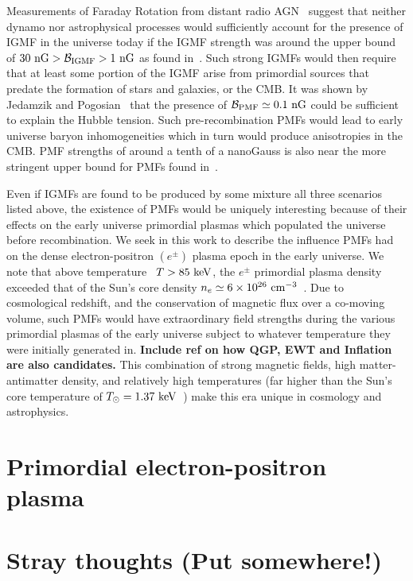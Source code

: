 \documentclass[a4paper]{article}
\begin{document}
Measurements of Faraday Rotation from distant radio AGN~\cite{pomakov2022redshift} suggest that neither dynamo nor astrophysical processes would sufficiently account for the presence of IGMF in the universe today if the IGMF strength was around the upper bound of $30{\rm\ nG}>{\cal B}_{\rm IGMF}>1{\rm\ nG}$ as found in~\cite{vernstrom2021discovery}. Such strong IGMFs would then require that at least some portion of the IGMF arise from primordial sources that predate the formation of stars and galaxies, or the CMB. It was shown by Jedamzik and Pogosian~\cite{jedamzik2020relieving} that the presence of ${\cal B}_{\rm PMF}\simeq0.1{\rm\ nG}$ could be sufficient to explain the Hubble tension. Such pre-recombination PMFs would lead to early universe baryon inhomogeneities which in turn would produce anisotropies in the CMB. PMF strengths of around a tenth of a nanoGauss is also near the more stringent upper bound for PMFs found in~\cite{jedamzik2019stringent}.

Even if IGMFs are found to be produced by some mixture all three scenarios listed above, the existence of PMFs would be uniquely interesting because of their effects on the early universe primordial plasmas which populated the universe before recombination. We seek in this work to describe the influence PMFs had on the dense electron-positron $(e^{\pm})$ plasma epoch in the early universe. We note that above temperature~\cite{rafelski2023short} $T>85\text{ keV}$, the $e^{\pm}$ primordial plasma density exceeded that of the Sun's core density $n_{e}\simeq6\times10^{26}{\rm\ cm}^{-3}$~\cite{bahcall2001solar}. Due to cosmological redshift, and the conservation of magnetic flux over a co-moving volume, such PMFs would have extraordinary field strengths during the various primordial plasmas of the early universe subject to whatever temperature they were initially generated in. \textbf{Include ref on how QGP, EWT and Inflation are also candidates.} This combination of strong magnetic fields, high matter-antimatter density, and relatively high temperatures (far higher than the Sun's core temperature of $T_{\odot}=1.37\text{ keV}$~\cite{castellani1997solar}) make this era unique in cosmology and astrophysics.

\section{Primordial electron-positron plasma}\label{sec:ElectronPositron}



\section{Stray thoughts (Put somewhere!)}
\end{document}
